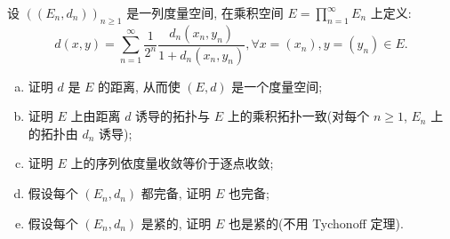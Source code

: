 \documentclass{mathexercise}
\begin{document}
\begin{exercise}
    设 $((E_n,d_n))_{n\geq 1}$ 是一列度量空间, 在乘积空间 $E=\prod_{n=1}^{\infty}E_n$ 上定义:
    \[d(x,y)=\sum_{n=1}^{\infty}\frac{1}{2^n}\frac{d_n(x_n,y_n)}{1+d_n(x_n,y_n)},\forall x=(x_n),y=(y_n)\in E.\]
    \begin{enumerate}[(a)]
    \item 证明 $d$ 是 $E$ 的距离, 从而使 $(E,d)$ 是一个度量空间;
    \item 证明 $E$ 上由距离 $d$ 诱导的拓扑与 $E$ 上的乘积拓扑一致(对每个 $n\geq 1$, $E_n$ 上的拓扑由 $d_n$ 诱导);
    \item 证明 $E$ 上的序列依度量收敛等价于逐点收敛;
    \item 假设每个 $(E_n,d_n)$ 都完备, 证明 $E$ 也完备;
    \item 假设每个 $(E_n,d_n)$ 是紧的, 证明 $E$ 也是紧的(不用 Tychonoff 定理).
    \end{enumerate}
\end{exercise}
    
\end{document}
